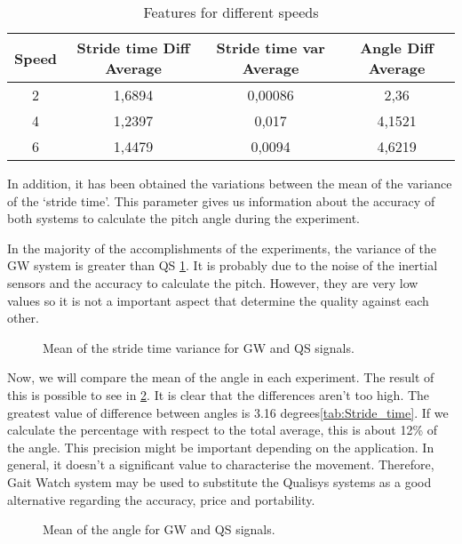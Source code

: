 \begin{table}[h]
	\caption{Features for different speeds}	
	\centering
	\begin{tabular}{|c|c|c|c|}\hline
		
		Speed & Stride time Diff Average & Stride time var Average & Angle Diff Average	 	\\ \hline
		2  & 1,6894	 & 0,00086 & 2,36 \\
		4 & 1,2397	& 0,017 & 4,1521\\
		6 & 1,4479 & 0,0094	& 4,6219
		\\ \hline
	\end{tabular}
	\label{tab:speeds}
	
\end{table}

In addition, it has been obtained the variations between the mean of the variance of the ‘stride time’. This parameter gives us information about the accuracy of both systems to calculate the pitch angle during the experiment.

In the majority of the accomplishments of the experiments, the variance of the GW system is greater than QS \ref{fig:var_stride_time}. It is probably due to the noise of the inertial sensors and the accuracy to calculate the pitch. However, they are very low values so it is not a important aspect that determine the quality against each other. 

\begin{figure}[H]
	\centering
	\caption{Mean of the stride time variance for GW and QS signals.}
	\label{fig:var_stride_time}
\end{figure}

Now, we will compare the mean of the angle in each experiment. The result of this is possible to see in \ref{fig:mean_angle}. It is clear that the differences aren’t too high. The greatest value of difference between angles is 3.16 degrees\ref{tab:Stride_time}. If we calculate the percentage with respect to the total average, this is about 12\% of the angle. This precision might be important depending on the application. In general, it doesn’t a significant value to characterise the movement. Therefore, Gait Watch system may be used to substitute the Qualisys systems as a good alternative regarding the accuracy, price and portability.

\begin{figure}[H]
	\centering
	\caption{Mean of the angle for GW and QS signals.}
	\label{fig:mean_angle}
\end{figure}

